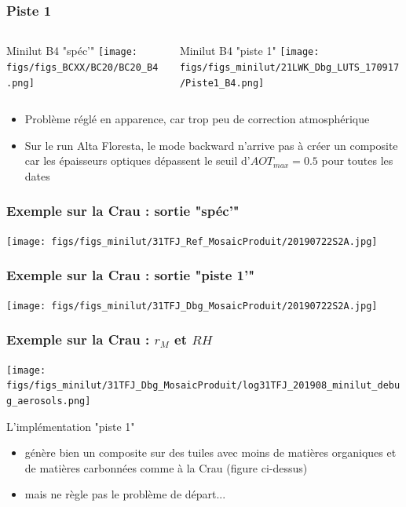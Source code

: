 \documentclass[8pt]{beamer}
\begin{document}
\begin{frame}
\frametitle{Piste 1}
	\begin{columns}
		\begin{column}{0.5\textwidth}
			\begin{center}
				Minilut B4 "spéc'"
		     	\texttt{[image: figs/figs\_BCXX/BC20/BC20\_B4.png]}
		    \end{center}		
		    
		\end{column}
		\begin{column}{0.5\textwidth}
			\begin{center}
				Minilut B4 "piste 1"	
				\texttt{[image: figs/figs\_minilut/21LWK\_Dbg\_LUTS\_170917/Piste1\_B4.png]}
		    \end{center}
		\end{column}
	\end{columns}
	\begin{itemize}
		\item Problème réglé en apparence, car trop peu de correction atmosphérique
		\item Sur le run Alta Floresta, le mode backward n'arrive pas à créer un composite car les épaisseurs optiques dépassent le seuil d'$AOT_{max} = 0.5$ pour toutes les dates
	\end{itemize}
\end{frame}

\begin{frame}
\frametitle{Exemple sur la Crau : sortie "spéc'"}
			\begin{center}
		     	\texttt{[image: figs/figs\_minilut/31TFJ\_Ref\_MosaicProduit/20190722S2A.jpg]}
		    \end{center}		
\end{frame}

\begin{frame}
\frametitle{Exemple sur la Crau : sortie "piste 1'"}
	\begin{center}
     	\texttt{[image: figs/figs\_minilut/31TFJ\_Dbg\_MosaicProduit/20190722S2A.jpg]}
    \end{center}		
\end{frame}

\begin{frame}
\frametitle{Exemple sur la Crau : $r_{M}$ et $RH$}
	\texttt{[image: figs/figs\_minilut/31TFJ\_Dbg\_MosaicProduit/log31TFJ\_201908\_minilut\_debug\_aerosols.png]}

	L'implémentation "piste 1"
	\begin{itemize}
		\item génère bien un composite sur des tuiles avec moins de matières organiques et de matières carbonnées comme à la Crau (figure ci-dessus)
		\item mais ne règle pas le problème de départ...
	\end{itemize}
\end{frame}
\end{document}
